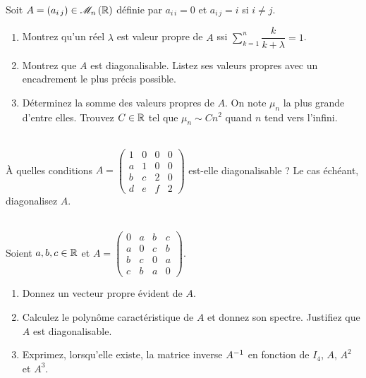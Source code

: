 \begin{exo}
Soit \(A=\paren{a_{i\,j}}\in\M{n}[\R]\) définie par \(a_{i\,i}=0\) et \(a_{i\,j}=i\) si \(i\not=j\).

\begin{enumerate}
    \item Montrez qu'un réel \(\lambda\) est valeur propre de \(A\) ssi \(\sum_{k=1}^n\dfrac{k}{k+\lambda}=1\). \\
    \item Montrez que \(A\) est diagonalisable. Listez ses valeurs propres avec un encadrement le plus précis possible. \\
    \item Déterminez la somme des valeurs propres de \(A\). On note \(\mu_n\) la plus grande d'entre elles. Trouvez \(C\in\mathbb{R}\) tel que \(\mu_n\sim Cn^2\) quand \(n\) tend vers l'infini.
\end{enumerate}
\end{exo}



\begin{exo}~\\
À quelles conditions \(A=\begin{pmatrix}
1 & 0 & 0 & 0 \\
a & 1 & 0 & 0 \\
b & c & 2 & 0 \\
d & e & f & 2
\end{pmatrix}\) est-elle diagonalisable ? Le cas échéant, diagonalisez \(A\).
\end{exo}



\begin{exo}~\\
Soient \(a,b,c\in\mathbb{R}\) et \(A=\begin{pmatrix}
0 & a & b & c \\
a & 0 & c & b \\
b & c & 0 & a \\
c & b & a & 0
\end{pmatrix}\).

\begin{enumerate}
    \item Donnez un vecteur propre évident de \(A\). \\
    \item Calculez le polynôme caractéristique de \(A\) et donnez son spectre. Justifiez que \(A\) est diagonalisable. \\
    \item Exprimez, lorsqu'elle existe, la matrice inverse \(A^{-1}\) en fonction de \(I_4\), \(A\), \(A^2\) et \(A^3\).
\end{enumerate}
\end{exo}



